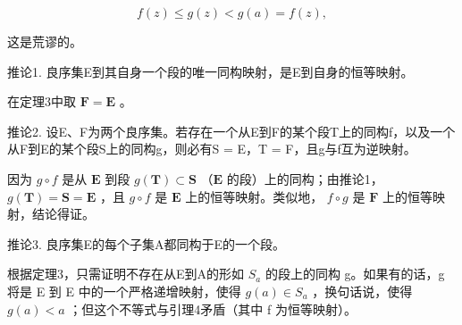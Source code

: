 \[
f (z) \leqslant g (z) <   g (a) = f (z),
\]

这是荒谬的。

推论1. 良序集E到其自身一个段的唯一同构映射，是E到自身的恒等映射。

在定理3中取 \(\mathbf{F} = \mathbf{E}\) 。

推论2. 设E、F为两个良序集。若存在一个从E到F的某个段T上的同构f，以及一个从F到E的某个段S上的同构g，则必有S = E，T = F，且g与f互为逆映射。

因为 \(g \circ f\) 是从 \(\mathbf{E}\) 到段 \(g(\mathbf{T}) \subset \mathbf{S}\) （\(\mathbf{E}\) 的段）上的同构；由推论1， \(g(\mathbf{T}) = \mathbf{S} = \mathbf{E}\) ，且 \(g \circ f\) 是 \(\mathbf{E}\) 上的恒等映射。类似地， \(f \circ g\) 是 \(\mathbf{F}\) 上的恒等映射，结论得证。

推论3. 良序集E的每个子集A都同构于E的一个段。

根据定理3，只需证明不存在从E到A的形如 \(S_{a}\) 的段上的同构 g。如果有的话，g 将是 E 到 E 中的一个严格递增映射，使得 \(g(a) \in S_{a}\) ，换句话说，使得 \(g(a) < a\) ；但这个不等式与引理4矛盾（其中 f 为恒等映射）。

